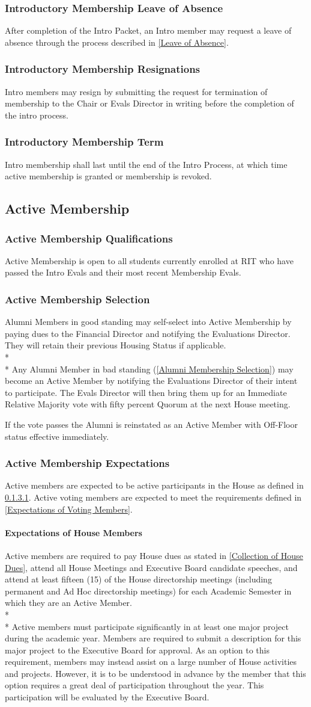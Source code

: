 \documentclass{article}
\newcommand{\asection}[1]{\subsection{#1} \label{#1}}
\newcommand{\asubsection}[1]{\subsubsection{#1} \label{#1}}
\newcommand{\asubsubsection}[1]{\paragraph{#1} \label{#1}}
\begin{document}
\asubsection{Introductory Membership Leave of Absence}
After completion of the Intro Packet, an Intro member may request a leave of absence through the process described in \ref{Leave of Absence}.

\asubsection{Introductory Membership Resignations}
Intro members may resign by submitting the request for termination of membership to the Chair or Evals Director in writing before the completion of the intro process.
\asubsection{Introductory Membership Term}
Intro membership shall last until the end of the Intro Process, at which time active membership is granted or membership is revoked.

\asection{Active Membership}

\asubsection{Active Membership Qualifications}
Active Membership is open to all students currently enrolled at RIT who have passed the Intro Evals and their most recent Membership Evals.

\asubsection{Active Membership Selection}

Alumni Members in good standing may self-select into Active Membership by paying dues to the Financial Director and notifying the Evaluations Director. They will retain their previous Housing Status if applicable.
\\*\\*
Any Alumni Member in bad standing (\ref{Alumni Membership Selection}) may become an Active Member by notifying the Evaluations Director of their intent to participate.
The Evals Director will then bring them up for an Immediate Relative Majority vote with fifty percent Quorum at the next House meeting.

If the vote passes the Alumni is reinstated as an Active Member with Off-Floor status effective immediately.

\asubsection{Active Membership Expectations}
Active members are expected to be active participants in the House as defined in \ref{Expectations of House Members}.
Active voting members are expected to meet the requirements defined in \ref{Expectations of Voting Members}.

\asubsubsection{Expectations of House Members}
Active members are required to pay House dues as stated in \ref{Collection of House Dues}, attend all House Meetings and Executive Board candidate speeches, and attend at least fifteen (15) of the House directorship meetings (including permanent and Ad Hoc directorship meetings) for each Academic Semester in which they are an Active Member.
\\* \\*
Active members must participate significantly in at least one major project during the academic year.
Members are required to submit a description for this major project to the Executive Board for approval.
As an option to this requirement, members may instead assist on a large number of House activities and projects.
However, it is to be understood in advance by the member that this option requires a great deal of participation throughout the year.
This participation will be evaluated by the Executive Board.
\end{document}
